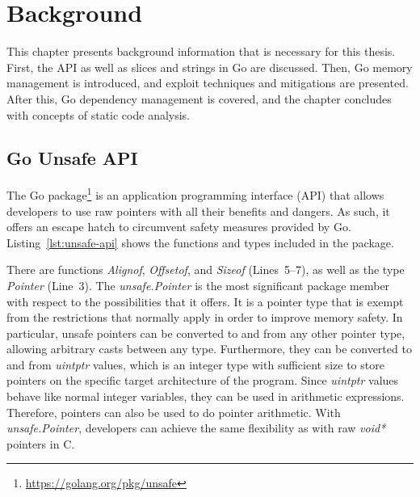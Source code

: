 
\chapter{Background}\label{ch:background}

This chapter presents background information that is necessary for this thesis.
First, the \unsafe{} \acrshort{API} as well as slices and strings in Go are discussed.
Then, Go memory management is introduced, and exploit techniques and mitigations are presented.
After this, Go dependency management is covered, and the chapter concludes with concepts of static code analysis.



\section{Go Unsafe API}\label{sec:background:unsafe-api}

The Go \unsafe{} package\footnote{\url{https://golang.org/pkg/unsafe}} is an application programming interface
(\acrshort{API}) that allows developers to use raw pointers with all their benefits and dangers.
As such, it offers an escape hatch to circumvent safety measures provided by Go.
Listing~\ref{lst:unsafe-api} shows the functions and types included in the \unsafe{} package.



There are  functions \textit{Alignof}, \textit{Offsetof}, and \textit{Sizeof} (Lines~5--7),
as well as the type \textit{Pointer} (Line~3).
The \textit{unsafe.Pointer} is the most significant package member with respect to the possibilities that it offers.
It is a pointer type that is exempt from the restrictions that normally apply in order to improve memory safety.
In particular, unsafe pointers can be converted to and from any other pointer type, allowing arbitrary casts between
any type.
Furthermore, they can be converted to and from \textit{uintptr} values, which is an integer type with sufficient size
to store pointers on the specific target architecture of the program.
Since \textit{uintptr} values behave like normal integer variables, they can be used in arithmetic expressions.
Therefore, \unsafe{} pointers can also be used to do pointer arithmetic.
With \textit{unsafe.Pointer}, developers can achieve the same flexibility as with raw \textit{void*} pointers in C.

